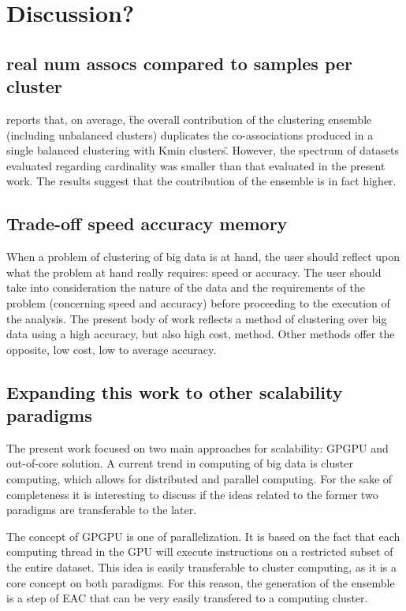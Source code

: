 
\chapter{Discussion?}
\label{chapter:discussion}

\section{real num assocs compared to samples per cluster}

\cite{Lourenco2010} reports that, on average, \"the overall contribution of the clustering ensemble (including unbalanced clusters) duplicates the co-associations produced in a single balanced clustering with Kmin clusters\".
However, the spectrum of datasets evaluated regarding cardinality was smaller than that evaluated in the present work.
The results suggest that the contribution of the ensemble is in fact higher. %

\section{Trade-off speed accuracy memory}

When a problem of clustering of big data is at hand, the user should reflect upon what the problem at hand really requires: speed or accuracy. The user should take into consideration the nature of the data and the requirements of the problem (concerning speed and accuracy) before proceeding to the execution of the analysis. The present body of work reflects a method of clustering over big data using a high accuracy, but also high cost, method. Other methods offer the opposite, low cost, low to average accuracy. 



\section{Expanding this work to other scalability paradigms}
The present work focused on two main approaches for scalability: GPGPU and out-of-core solution. A current trend in computing of big data is cluster computing, which allows for distributed and parallel computing. For the sake of completeness it is interesting to discuss if the ideas related to the former two paradigms are transferable to the later.

The concept of GPGPU is one of parallelization. It is based on the fact that each computing thread in the GPU will execute instructions on a restricted subset of the entire dataset. This idea is easily transferable to cluster computing, as it is a core concept on both paradigms.
For this reason, the generation of the ensemble is a step of EAC that can be very easily transfered to a computing cluster.

